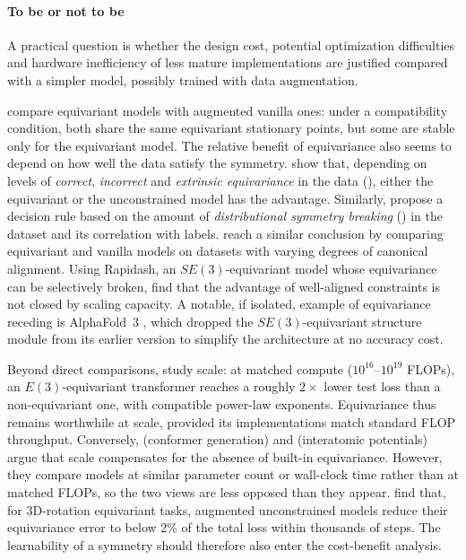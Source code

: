 \documentclass[mathematics,review,submit,moreauthors]{Definitions/mdpi}
\begin{document}
\paragraph{To be or not to be}
A practical question is whether the design cost, potential optimization difficulties and hardware inefficiency of less mature implementations are justified compared with a simpler model, possibly trained with data augmentation.

\citet{nordenfors2024} compare equivariant models with augmented vanilla ones: under a compatibility condition, both share the same equivariant stationary points, but some are stable only for the equivariant model.
The relative benefit of equivariance also seems to depend on how well the data satisfy the symmetry.
\citet{wang2023a} show that, depending on levels of \emph{correct}, \emph{incorrect} and \emph{extrinsic equivariance} in the data (), either the equivariant or the unconstrained model has the advantage.
Similarly, \citet{lawrence2026} propose a decision rule based on the amount of \emph{distributional symmetry breaking} () in the dataset and its correlation with labels.
\citet{rygiel2026} reach a similar conclusion by comparing equivariant and vanilla models on datasets with varying degrees of canonical alignment.
Using Rapidash, an $SE(3)$-equivariant model whose equivariance can be selectively broken, \citet{vadgama2025} find that the advantage of well-aligned constraints is not closed by scaling capacity.
A notable, if isolated, example of equivariance receding is AlphaFold~3 \citep{abramson2024n}, which dropped the $SE(3)$-equivariant structure module from its earlier version \citep{jumper2021na} to simplify the architecture at no accuracy cost.

Beyond direct comparisons, \citet{brehmer2025} study scale: at matched compute ($10^{16}$--$10^{19}$ FLOPs), an $E(3)$-equivariant transformer reaches a roughly $2\times$ lower test loss than a non-equivariant one, with compatible power-law exponents.
Equivariance thus remains worthwhile at scale, provided its implementations match standard FLOP throughput.
Conversely, \citet{wang2024p4icmla} (conformer generation) and \citet{qu2024anips} (interatomic potentials) argue that scale compensates for the absence of built-in equivariance.
However, they compare models at similar parameter count or wall-clock time rather than at matched FLOPs, so the two views are less opposed than they appear.
\citet{shen2026} find that, for 3D-rotation equivariant tasks, augmented unconstrained models reduce their equivariance error to below 2\% of the total loss within thousands of steps.
The learnability of a symmetry should therefore also enter the cost-benefit analysis.
\end{document}
